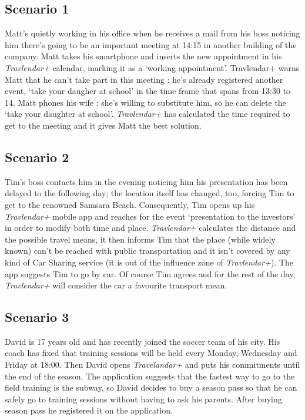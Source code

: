 \subsection{Scenario 1}

Matt’s quietly working in his office when he receives a mail from his boss noticing him there’s going to be an important meeting at 14:15 in another building of the company.
Matt takes his smartphone and inserts the new appointment in his \textit{Travlendar+} calendar, marking it as a ‘working appointment’.
Travlendar+ warns Matt that he can’t take part in this meeting : he’s already registered another event, ‘take your daugher at school’ in the time frame that spans from 13:30 to 14.
Matt phones his wife : she’s willing to substitute him, so he can delete the ‘take your daughter at school’.
\textit{Travlendar+} has calculated the time required to get to the meeting and it gives Matt the best solution.

\subsection{Scenario 2}

Tim’s boss contacts him in the evening noticing him his presentation has been delayed to the following day; the location itself has changed, too, forcing Tim to get to the renowned Samsara Beach.
Consequently, Tim opens up his \textit{Travlendar+} mobile app and reaches for the event ‘presentation to the investors’ in order to modify both time and place.
\textit{Travlendar+} calculates the distance and the possible travel means, it then informs Tim that the place (while widely known) can’t be reached with public transportation and it isn’t covered by any kind of Car Sharing service (it is out of the influence zone of \textit{Travlendar+}).
The app suggests Tim to go by car. Of course Tim agrees and for the rest of the day, \textit{Travlendar+} will consider the car a favourite transport mean.

\subsection{Scenario 3}

David is 17 years old and has recently joined the soccer team of his city. His coach has fixed that training sessions will be held every Monday, Wednesday and Friday at 18:00.
Then David opens \textit{Travelandar+} and puts his commitments until the end of the season. The application suggests that the fastest way to go to the field training is the subway, so David decides to buy a season pass so that he can safely go to training sessions without having to ask his parents.
After buying season pass he registered it on the application.

